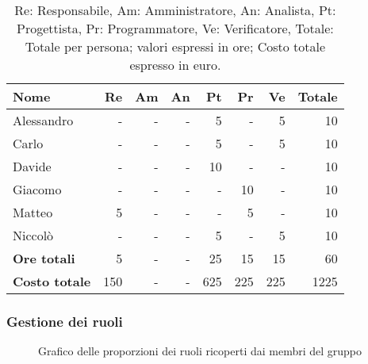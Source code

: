 \begin{table}[H]
	\centering
	\begin{tabular}{l|r|r|r|r|r|r|r}
		\textbf{Nome}         & \textbf{Re} & \textbf{Am} & \textbf{An} & \textbf{Pt} & \textbf{Pr} & \textbf{Ve} & \textbf{Totale} \\
		\hline
		Alessandro            & -           & -           & -           & 5           & -           & 5           & 10              \\
		Carlo                 & -           & -           & -           & 5           & -           & 5           & 10              \\
		Davide                & -           & -           & -           & 10          & -           & -           & 10              \\
		Giacomo               & -           & -           & -           & -           & 10           & -           & 10               \\
		Matteo                & 5           & -           & -           & -           & 5           & -           & 10              \\
		Niccolò               & -           & -           & -           & 5           & -           & 5           & 10               \\
		\hline
		\textbf{Ore totali}   & 5           & -           & -           & 25          & 15          & 15           & 60              \\
		\textbf{Costo totale} & 150         & -           & -           & 625         & 225         & 225          & 1225
	\end{tabular}
	\caption{Re: Responsabile, Am: Amministratore, An: Analista, Pt: Progettista,
		Pr: Programmatore, Ve: Verificatore, Totale: Totale per persona; valori espressi in ore; Costo totale espresso in euro.}
\end{table}

\newpage
\subsubsection{Gestione dei ruoli}

\begin{figure}[h]
	\centering
	\caption{Grafico delle proporzioni dei ruoli ricoperti dai membri del gruppo}
\end{figure}

